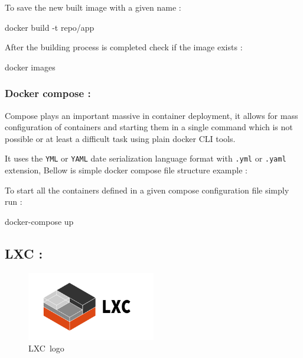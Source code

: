 \documentclass[
  14pt,
  english,
  a4paper,
]{scrreprt}
\newenvironment{Shaded}{}{}
\newcommand{\ExtensionTok}[1]{#1}
\newcommand{\NormalTok}[1]{#1}
\begin{document}
To save the new built image with a given name :

\begin{Shaded}
\begin{Highlighting}[]
\ExtensionTok{docker}\NormalTok{ build {-}t repo/app}
\end{Highlighting}
\end{Shaded}

After the building process is completed check if the image exists :

\begin{Shaded}
\begin{Highlighting}[]
\ExtensionTok{docker}\NormalTok{ images}
\end{Highlighting}
\end{Shaded}

\hypertarget{docker-compose}{%
\subsubsection{Docker compose :}\label{docker-compose}}

Compose plays an important massive in container deployment, it allows
for mass configuration of containers and starting them in a single
command which is not possible or at least a difficult task using plain
docker CLI tools.

It uses the \texttt{YML} or \texttt{YAML} date serialization language
format with \texttt{.yml} or \texttt{.yaml} extension, Bellow is simple
docker compose file structure example :

To start all the containers defined in a given compose configuration
file simply run :

\begin{Shaded}
\begin{Highlighting}[]
\ExtensionTok{docker{-}compose}\NormalTok{ up}
\end{Highlighting}
\end{Shaded}

\hypertarget{lxc}{%
\subsection{LXC :}\label{lxc}}

\begin{figure}
\centering
\includegraphics[width=0.5\textwidth,height=\textheight]{figures/Lxc-logo.png}
\caption{LXC~logo}
\end{figure}
\end{document}
